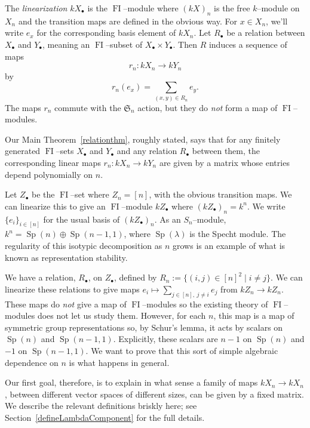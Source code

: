 \documentclass[ALCO,ThmDefs,Unicode,epreuves]{cedram}
\DeclareMathOperator{\FI}{FI}
\DeclareMathOperator{\Sp}{Sp}
\newcommand{\Sn}{\mathfrak{S}}
\newcommand{\dt}{\bullet}
\begin{document}
The \emph{linearization} $k X_{\dt}$ is the $\FI$--module where $(k X)_n$ is the free $k$--module on $X_n$ and the transition maps are defined in the obvious way. For $x \in X_n$, we'll write $e_x$ for the corresponding basis element of $k X_n$.
Let $R_{\dt}$ be a relation between $X_{\dt}$ and $Y_{\dt}$, meaning an $\FI$--subset of $X_{\dt} \times Y_{\dt}$. Then $R$ induces a sequence of maps
\[ r_n : k X_n \to k Y_n \]
by
\[ r_n(e_x) = \sum_{(x,y) \in R_n} e_y. \]
The maps $r_n$ commute with the $\Sn_n$ action, but they do \emph{not} form a map of $\FI$--modules.

Our Main Theorem~\ref{relationthm}, roughly stated, says that for any finitely generated $\FI$--sets $X_{\dt}$ and $Y_{\dt}$ and any relation $R_\dt$ between them, the corresponding linear maps $r_n: k X_n \to k Y_n$ are given by a matrix whose entries depend polynomially on $n$. 
\begin{eg} \label{RelationExample}
Let $Z_{\dt}$ be the $\FI$--set where $Z_n = [n]$, with the obvious transition maps. We can linearize this to give an $\FI$--module $k Z_{\dt}$ where $(k Z_{\dt})_n = k^n$. We write $\{ e_i \}_{i \in [n]}$ for the usual basis of $(k Z_{\dt})_n$. As an $S_n$--module, $k^n = \Sp(n) \oplus \Sp(n-1, 1)$, where $\Sp(\lambda)$ is the Specht module. The regularity of this isotypic decomposition as $n$ grows is an example of what is known as representation stability. 

We have a relation, $R_{\dt}$, on $Z_{\dt}$, defined by $R_n := \{ (i,j) \in [n]^2 \mid i \neq j \}$. We can linearize these relations to give maps $e_i \mapsto \sum_{j \in [n],\ j \neq i} e_j$ from $k Z_n \to k Z_n$. These maps do \emph{not} give a map of $\FI$--modules so the existing theory of $\FI$--modules does not let us study them. However, for each $n$, this map is a map of symmetric group representations so, by Schur's lemma, it acts by scalars on $\Sp(n)$ and $\Sp(n-1,1)$. Explicitly, these scalars are $n-1$ on $\Sp(n)$ and $-1$ on $\Sp(n-1,1)$. We want to prove that this sort of simple algebraic dependence on $n$ is what happens in general. 
\end{eg}

Our first goal, therefore, is to explain in what sense a family of maps $k X_n \to k X_n$, between different vector spaces of different sizes, can be given by a fixed matrix. We describe the relevant definitions briskly here; see Section~\ref{defineLambdaComponent} for the full details.
\end{document}
